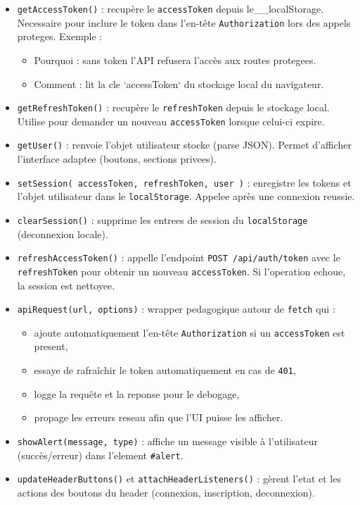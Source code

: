 \documentclass[a4paper,12pt]{book}
\begin{document}
\begin{itemize}
    \item \texttt{getAccessToken()} : recupère le \texttt{accessToken} depuis le\_\_localStorage. Necessaire pour inclure le token dans l'en-tête \texttt{Authorization} lors des appels proteges. Exemple :
    \begin{itemize}
        \item Pourquoi : sans token l'API refusera l'accès aux routes protegees.
        \item Comment : lit la cle `accessToken` du stockage local du navigateur.
    \end{itemize}

    \item \texttt{getRefreshToken()} : recupère le \texttt{refreshToken} depuis le stockage local. Utilise pour demander un nouveau \texttt{accessToken} lorsque celui-ci expire.

    \item \texttt{getUser()} : renvoie l'objet utilisateur stocke (parse JSON). Permet d'afficher l'interface adaptee (boutons, sections privees).

    \item \texttt{setSession({ accessToken, refreshToken, user })} : enregistre les tokens et l'objet utilisateur dans le \texttt{localStorage}. Appelee après une connexion reussie.

    \item \texttt{clearSession()} : supprime les entrees de session du \texttt{localStorage} (deconnexion locale).

    \item \texttt{refreshAccessToken()} : appelle l'endpoint \texttt{POST /api/auth/token} avec le \texttt{refreshToken} pour obtenir un nouveau \texttt{accessToken}. Si l'operation echoue, la session est nettoyee.

    \item \texttt{apiRequest(url, options)} : wrapper pedagogique autour de \texttt{fetch} qui :
    \begin{itemize}
        \item ajoute automatiquement l'en-tête \texttt{Authorization} si un \texttt{accessToken} est present,
        \item essaye de rafraîchir le token automatiquement en cas de \texttt{401},
        \item logge la requête et la reponse pour le debogage,
        \        \item propage les erreurs reseau afin que l'UI puisse les afficher.
    \end{itemize}

    \item \texttt{showAlert(message, type)} : affiche un message visible à l'utilisateur (succès/erreur) dans l'element \texttt{#alert}.

    \item \texttt{updateHeaderButtons()} et \texttt{attachHeaderListeners()} : gèrent l'etat et les actions des boutons du header (connexion, inscription, deconnexion).
\end{itemize}
\end{document}
